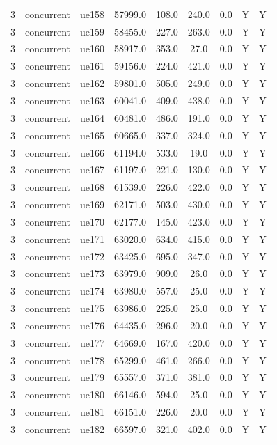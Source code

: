 \begin{table}[ht]
\begin{tabular}{|c|c|c|c|c|c|c|c|c|}
3 & concurrent & ue158 & 57999.0 & 108.0 & 240.0 & 0.0 & Y & Y \\
3 & concurrent & ue159 & 58455.0 & 227.0 & 263.0 & 0.0 & Y & Y \\
3 & concurrent & ue160 & 58917.0 & 353.0 & 27.0 & 0.0 & Y & Y \\
3 & concurrent & ue161 & 59156.0 & 224.0 & 421.0 & 0.0 & Y & Y \\
3 & concurrent & ue162 & 59801.0 & 505.0 & 249.0 & 0.0 & Y & Y \\
3 & concurrent & ue163 & 60041.0 & 409.0 & 438.0 & 0.0 & Y & Y \\
3 & concurrent & ue164 & 60481.0 & 486.0 & 191.0 & 0.0 & Y & Y \\
3 & concurrent & ue165 & 60665.0 & 337.0 & 324.0 & 0.0 & Y & Y \\
3 & concurrent & ue166 & 61194.0 & 533.0 & 19.0 & 0.0 & Y & Y \\
3 & concurrent & ue167 & 61197.0 & 221.0 & 130.0 & 0.0 & Y & Y \\
3 & concurrent & ue168 & 61539.0 & 226.0 & 422.0 & 0.0 & Y & Y \\
3 & concurrent & ue169 & 62171.0 & 503.0 & 430.0 & 0.0 & Y & Y \\
3 & concurrent & ue170 & 62177.0 & 145.0 & 423.0 & 0.0 & Y & Y \\
3 & concurrent & ue171 & 63020.0 & 634.0 & 415.0 & 0.0 & Y & Y \\
3 & concurrent & ue172 & 63425.0 & 695.0 & 347.0 & 0.0 & Y & Y \\
3 & concurrent & ue173 & 63979.0 & 909.0 & 26.0 & 0.0 & Y & Y \\
3 & concurrent & ue174 & 63980.0 & 557.0 & 25.0 & 0.0 & Y & Y \\
3 & concurrent & ue175 & 63986.0 & 225.0 & 25.0 & 0.0 & Y & Y \\
3 & concurrent & ue176 & 64435.0 & 296.0 & 20.0 & 0.0 & Y & Y \\
3 & concurrent & ue177 & 64669.0 & 167.0 & 420.0 & 0.0 & Y & Y \\
3 & concurrent & ue178 & 65299.0 & 461.0 & 266.0 & 0.0 & Y & Y \\
3 & concurrent & ue179 & 65557.0 & 371.0 & 381.0 & 0.0 & Y & Y \\
3 & concurrent & ue180 & 66146.0 & 594.0 & 25.0 & 0.0 & Y & Y \\
3 & concurrent & ue181 & 66151.0 & 226.0 & 20.0 & 0.0 & Y & Y \\
3 & concurrent & ue182 & 66597.0 & 321.0 & 402.0 & 0.0 & Y & Y \\

\end{tabular}
\end{table}
